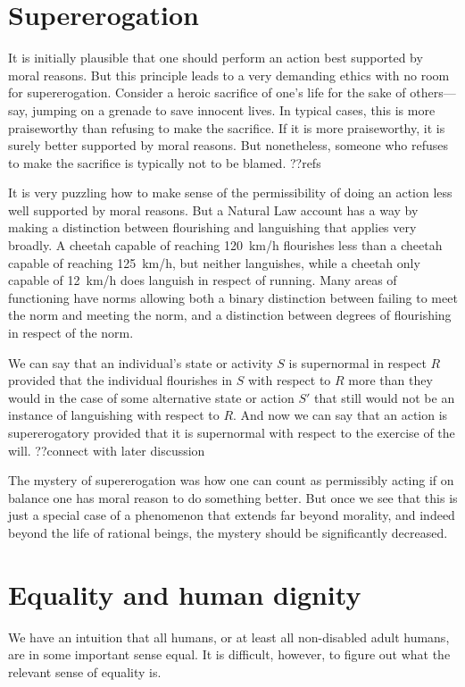 \section{Supererogation}
It is initially plausible that one should perform an action best supported by moral reasons. But this principle
leads to a very demanding ethics with no room for supererogation. Consider a heroic sacrifice of one's life for
the sake of others---say, jumping on a grenade to save innocent lives. In typical cases, this is more praiseworthy 
than refusing to make the sacrifice. If it is more praiseworthy, it is surely better supported by moral reasons. 
But nonetheless, someone who refuses to make the sacrifice is typically not to be blamed. ??refs

It is very puzzling how to make sense of the permissibility of doing an action less well supported by moral reasons. 
But a Natural Law account has a way by making a distinction between flourishing and languishing that applies very
broadly. A cheetah capable of reaching 120~km/h flourishes less than a cheetah capable of reaching 125~km/h, but 
neither languishes, while a cheetah only capable of 12~km/h does languish in respect of running. Many areas of 
functioning have norms allowing both a binary distinction between failing to meet the norm and meeting the norm,
and a distinction between degrees of flourishing in respect of the norm. 

We can say that an individual's state or activity $S$ is supernormal in respect $R$ provided that the individual flourishes 
in $S$ with respect to $R$ more than they would in the case of some alternative state or action $S'$ that
still would not be an instance of languishing with respect to $R$. And now we can say that an action is supererogatory
provided that it is supernormal with respect to the exercise of the will. 
??connect with later discussion

The mystery of supererogation was how one can count as permissibly acting if on balance one has moral reason to do something 
better. But once we see that this is just a special case of a phenomenon that extends far beyond morality, and indeed beyond
the life of rational beings, the mystery should be significantly decreased.

\section{Equality and human dignity}
We have an intuition that all humans, or at least all non-disabled adult humans, are in some important sense 
equal. It is difficult, however, to figure out what the relevant sense of equality is. 

